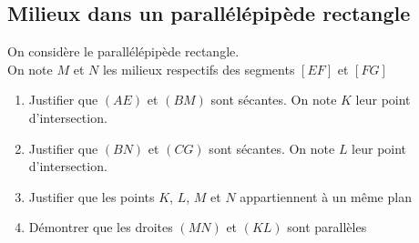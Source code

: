 \documentclass[oneside,12pt]{article}          %
\begin{document}
\subsection{Milieux dans un parallélépipède rectangle}
On considère le parallélépipède rectangle.\\
On note $M$ et $N$ les milieux respectifs des segments $[EF]$ et $[FG]$
\begin{enumerate}
    \item Justifier que $(AE)$ et $(BM)$ sont sécantes. On note $K$ leur point d'intersection.
    \item Justifier que $(BN)$ et $(CG)$ sont sécantes. On note $L$ leur point d'intersection.
    \item Justifier que les points $K$, $L$, $M$ et $N$ appartiennent à un même plan
    \item Démontrer que les droites $(MN)$ et $(KL)$ sont parallèles
\end{enumerate}
\end{document}
